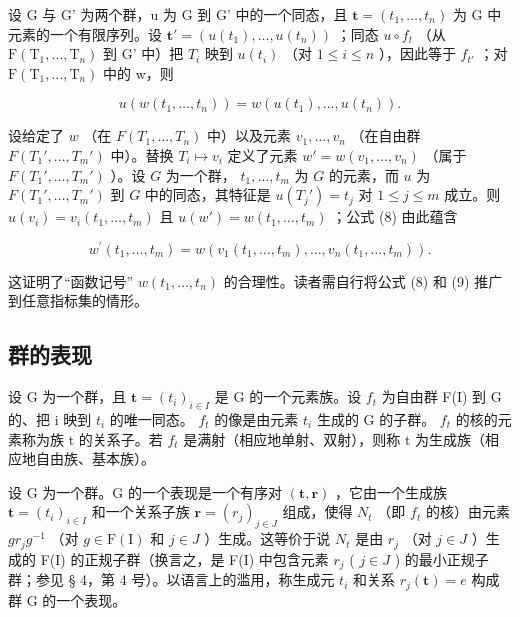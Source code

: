 设 G 与 G' 为两个群，u 为 G 到 G' 中的一个同态，且 \(\mathbf{t} = (t_{1}, \ldots, t_{n})\) 为 G 中元素的一个有限序列。设 \(\mathbf{t}' = (u(t_{1}), \ldots, u(t_{n}))\) ；同态 \(u \circ f_{t}\) （从 \(\mathrm{F}(\mathrm{T}_{1}, \ldots, \mathrm{T}_{n})\) 到 G' 中）把 \(T_{i}\) 映到 \(u(t_{i})\) （对 \(1 \leqslant i \leqslant n\) ），因此等于 \(f_{t'}\) ；对 \(\mathrm{F}(\mathrm{T}_{1}, \ldots, \mathrm{T}_{n})\) 中的 w，则

\[
u (w (t _ {1}, \dots , t _ {n})) = w (u (t _ {1}), \dots , u (t _ {n})).\tag{8}
\]

设给定了 \(w\) （在 \(F(T_1, \ldots, T_n)\) 中）以及元素 \(v_1, \ldots, v_n\) （在自由群 \(F(T_1', \ldots, T_m')\) 中）。替换 \(T_i \mapsto v_i\) 定义了元素 \(w' = w(v_1, \ldots, v_n)\) （属于 \(F(T_1', \ldots, T_m')\) ）。设 \(G\) 为一个群， \(t_1, \ldots, t_m\) 为 \(G\) 的元素，而 \(u\) 为 \(F(T_1', \ldots, T_m')\) 到 \(G\) 中的同态，其特征是 \(u(T_j') = t_j\) 对 \(1 \leqslant j \leqslant m\) 成立。则 \(u(v_i) = v_i(t_1, \ldots, t_m)\) 且 \(u(w') = w(t_1, \ldots, t_m)\) ；公式 (8) 由此蕴含

\[
w ^ {\prime} (t _ {1}, \dots , t _ {m}) = w (v _ {1} (t _ {1}, \dots , t _ {m}), \dots , v _ {n} (t _ {1}, \dots , t _ {m})).\tag{9}
\]

这证明了“函数记号” \(w(t_{1},\ldots,t_{n})\) 的合理性。读者需自行将公式 (8) 和 (9) 推广到任意指标集的情形。

\subsection{群的表现}

设 G 为一个群，且 \(\mathbf{t} = (t_{i})_{i \in I}\) 是 G 的一个元素族。设 \(f_{t}\) 为自由群 F(I) 到 G 的、把 i 映到 \(t_{i}\) 的唯一同态。 \(f_{t}\) 的像是由元素 \(t_{i}\) 生成的 G 的子群。 \(f_{t}\) 的核的元素称为族 t 的关系子。若 \(f_{t}\) 是满射（相应地单射、双射），则称 t 为生成族（相应地自由族、基本族）。

设 G 为一个群。G 的一个表现是一个有序对 \((\mathbf{t}, \mathbf{r})\) ，它由一个生成族 \(\mathbf{t} = (t_{i})_{i \in I}\) 和一个关系子族 \(\mathbf{r} = (r_{j})_{j \in J}\) 组成，使得 \(N_{t}\) （即 \(f_{t}\) 的核）由元素 \(gr_{j}g^{-1}\) （对 \(g \in \mathrm{F}(\mathrm{I})\) 和 \(j \in J\) ）生成。这等价于说 \(N_{t}\) 是由 \(r_{j}\) （对 \(j \in J\) ）生成的 F(I) 的正规子群（换言之，是 F(I) 中包含元素 \(r_{j}\) ( \(j \in J\) ) 的最小正规子群；参见 § 4，第 4 号）。以语言上的滥用，称生成元 \(t_{i}\) 和关系 \(r_{j}(\mathbf{t}) = e\) 构成群 G 的一个表现。


